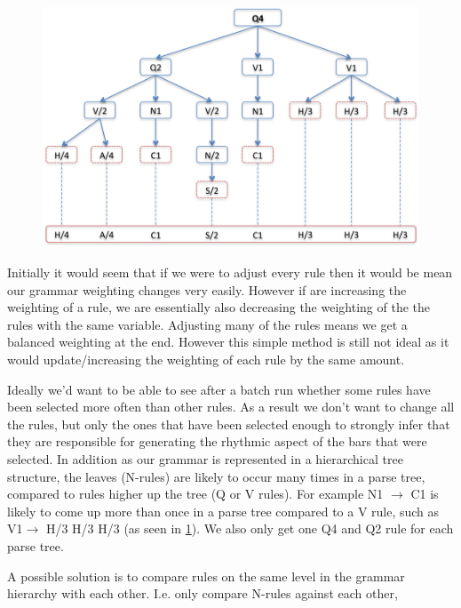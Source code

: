 \documentclass[pdftex,12pt,a4paper]{report}
\begin{document}
\begin{figure}[here]
  \centering
  \includegraphics[scale=0.85]{figure/q4exampleparsetree.png}
  \label{fig:q4exampleparsetree}
\end{figure}

Initially it would seem that if we were to adjust every rule then it would be mean our grammar weighting changes very easily. However if are increasing the weighting of a rule, we are essentially also decreasing the weighting of the the rules with the same variable. Adjusting many of the rules means we get a balanced weighting at the end. However this simple method is still not ideal as it would update/increasing the weighting of each rule by the same amount.

Ideally we'd want to be able to see after a batch run whether some rules have been selected more often than other rules. As a result we don't want to change all the rules, but only the ones that have been selected enough to strongly infer that they are responsible for generating the rhythmic aspect of the bars that were selected. In addition as our grammar is represented in a hierarchical tree structure, the leaves (N-rules) are likely to occur many times in a parse tree, compared to rules higher up the tree (Q or V rules). For example N1 $\rightarrow$ C1 is likely to come up more than once in a parse tree compared to a V rule, such as V1$\rightarrow$ H/3 H/3 H/3 (as seen in \ref{fig:q4exampleparsetree}). We also only get one Q4 and Q2 rule for each parse tree. 

A possible solution is to compare rules on the same level in the grammar hierarchy with each other. I.e. only compare N-rules against each other, 
\end{document}
